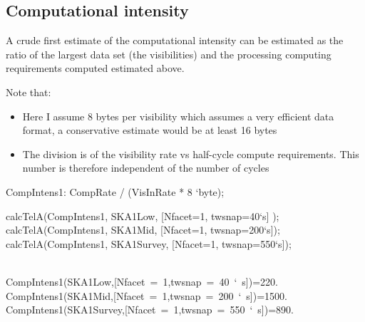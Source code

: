 \documentclass[useAMS,usenatbib,referee]{article}
\begin{document}
\subsection{Computational intensity}

A crude first estimate of the computational intensity can be estimated
as the ratio of the largest data set (the visibilities) and the
processing computing requirements computed estimated above.

Note that: 
\begin{itemize}
\item Here I assume 8 bytes per visibility which assumes a very
  efficient data format, a conservative estimate would be at least 16
  bytes
\item The division is of the visibility rate vs half-cycle compute
  requirements. This number is therefore independent of the number of
  cycles
\end{itemize}

\begin{maxima}[]
CompIntens1: CompRate /  (VisInRate * 8 `byte);

calcTelA(CompIntens1, SKA1Low, [Nfacet=1, twsnap=40`s] );
calcTelA(CompIntens1, SKA1Mid, [Nfacet=1, twsnap=200`s]);
calcTelA(CompIntens1, SKA1Survey, [Nfacet=1, twsnap=550`s]);

\maximaoutput*
{} \\
\m  \mbox{{}CompIntens1(SKA1Low,[Nfacet = 1,twsnap = 40 ` s]){}}=220. \\
\m  \mbox{{}CompIntens1(SKA1Mid,[Nfacet = 1,twsnap = 200 ` s]){}}=1500. \\
\m  \mbox{{}CompIntens1(SKA1Survey,[Nfacet = 1,twsnap = 550 ` s]){}}=890. \\
\end{maxima}
\end{document}
